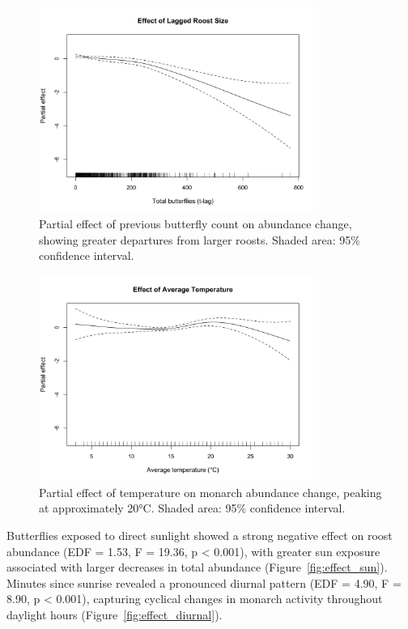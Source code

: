 \begin{figure}[htbp]
\centering
\includegraphics[width=0.8\textwidth]{supplemental/results/thesis_exports/figures/effect_lagged_roost_size.png}
\caption{Partial effect of previous butterfly count on abundance change, showing greater departures from larger roosts. Shaded area: 95\% confidence interval.}\label{fig:effect_roost_size}
\end{figure}

\begin{figure}[htbp]
\centering
\includegraphics[width=0.8\textwidth]{supplemental/results/thesis_exports/figures/effect_temperature.png}
\caption{Partial effect of temperature on monarch abundance change, peaking at approximately 20°C. Shaded area: 95\% confidence interval.}\label{fig:effect_temperature}
\end{figure}

Butterflies exposed to direct sunlight showed a strong negative effect on roost abundance (EDF = 1.53, F = 19.36, p < 0.001), with greater sun exposure associated with larger decreases in total abundance (Figure~\ref{fig:effect_sun}). Minutes since sunrise revealed a pronounced diurnal pattern (EDF = 4.90, F = 8.90, p < 0.001), capturing cyclical changes in monarch activity throughout daylight hours (Figure~\ref{fig:effect_diurnal}).

